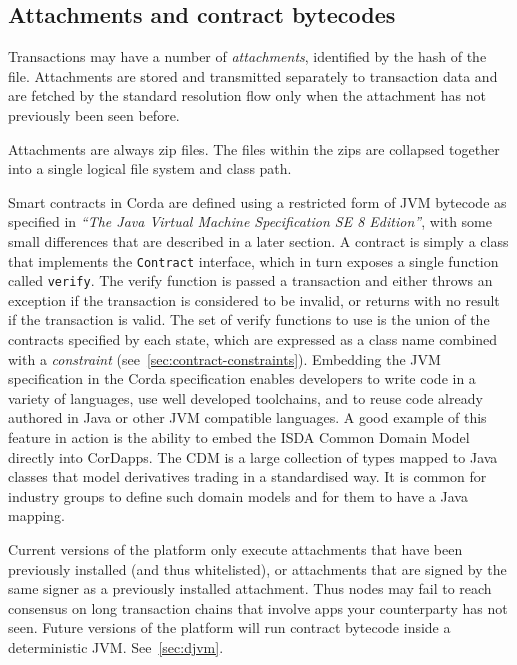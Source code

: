 \documentclass{article}
\begin{document}
\subsection{Attachments and contract bytecodes}\label{subsec:attachments-and-contract-bytecodes}

Transactions may have a number of \emph{attachments}, identified by the hash of the file. Attachments are stored
and transmitted separately to transaction data and are fetched by the standard resolution flow only when the
attachment has not previously been seen before.

Attachments are always zip files\cite{ZipFormat}. The files within the zips are collapsed together into a single
logical file system and class path.

Smart contracts in Corda are defined using a restricted form of JVM bytecode as specified in \emph{``The Java
Virtual Machine Specification SE 8 Edition''}\cite{JVM}, with some small differences that are described in a later
section. A contract is simply a class that implements the \texttt{Contract} interface, which in turn exposes a
single function called \texttt{verify}. The verify function is passed a transaction and either throws an exception
if the transaction is considered to be invalid, or returns with no result if the transaction is valid. The set of
verify functions to use is the union of the contracts specified by each state, which are expressed as a class name
combined with a \emph{constraint} (see~\cref{sec:contract-constraints}). Embedding the JVM specification in the
Corda specification enables developers to write code in a variety of languages, use well developed toolchains, and
to reuse code already authored in Java or other JVM compatible languages. A good example of this feature in action
is the ability to embed the ISDA Common Domain Model\cite{ISDACDM} directly into CorDapps. The CDM is
a large collection of types mapped to Java classes that model derivatives trading in a standardised way. It is
common for industry groups to define such domain models and for them to have a Java mapping.

Current versions of the platform only execute attachments that have been previously installed (and thus
whitelisted), or attachments that are signed by the same signer as a previously installed attachment. Thus nodes
may fail to reach consensus on long transaction chains that involve apps your counterparty has not seen. Future
versions of the platform will run contract bytecode inside a deterministic JVM. See~\cref{sec:djvm}.
\end{document}
